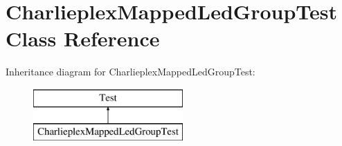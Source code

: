 \hypertarget{class_charlieplex_mapped_led_group_test}{}\section{Charlieplex\+Mapped\+Led\+Group\+Test Class Reference}
\label{class_charlieplex_mapped_led_group_test}
Inheritance diagram for Charlieplex\+Mapped\+Led\+Group\+Test\+:\begin{figure}[H]
\begin{center}
\leavevmode
\includegraphics[height=2.000000cm]{class_charlieplex_mapped_led_group_test}
\end{center}
\end{figure}
